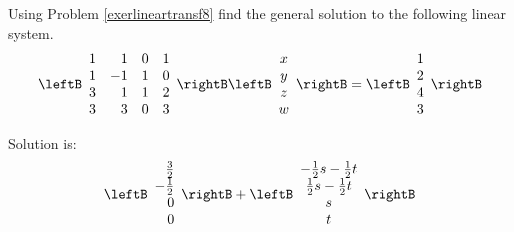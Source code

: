 \begin{enumialphparenastyle}
\begin{ex} Using Problem \ref{exerlineartransf8} find the general solution to the following
linear system.
\begin{equation*}
\leftB
\begin{array}{rrrr}
1 & 1 & 0 & 1 \\
1 & -1 & 1 & 0 \\
3 & 1 & 1 & 2 \\
3 & 3 & 0 & 3
\end{array}
\rightB \leftB
\begin{array}{c}
x \\
y \\
z \\
w
\end{array}
\rightB =\leftB
\begin{array}{r}
1 \\
2 \\
4 \\
3
\end{array}
\rightB 
\end{equation*}
\begin{sol}
Solution is:
\[
\leftB
\begin{array}{r}
\frac{3}{2} \\
-\frac{1}{2} \\
0 \\
0
\end{array}
\rightB +\leftB
\begin{array}{c}
-\frac{1}{2}s-\frac{1}{2}t \\
\frac{1}{2}s-\frac{1}{2}t \\
s \\
t
\end{array}
\rightB
\]
\end{sol}
\end{ex}


\end{enumialphparenastyle}
